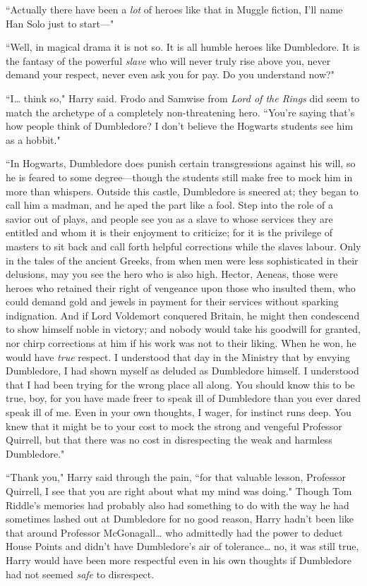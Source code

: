``Actually there have been a \emph{lot} of heroes like that in Muggle fiction, I'll name Han Solo just to start—"

``Well, in magical drama it is not so. It is all humble heroes like Dumbledore. It is the fantasy of the powerful \emph{slave} who will never truly rise above you, never demand your respect, never even ask you for pay. Do you understand now?"

``I{\ldots} think so," Harry said. Frodo and Samwise from \emph{Lord of the Rings} did seem to match the archetype of a completely non-threatening hero. ``You're saying that's how people think of Dumbledore? I don't believe the Hogwarts students see him as a hobbit."

``In Hogwarts, Dumbledore does punish certain transgressions against his will, so he is feared to some degree—though the students still make free to mock him in more than whispers. Outside this castle, Dumbledore is sneered at; they began to call him a madman, and he aped the part like a fool. Step into the role of a savior out of plays, and people see you as a slave to whose services they are entitled and whom it is their enjoyment to criticize; for it is the privilege of masters to sit back and call forth helpful corrections while the slaves labour. Only in the tales of the ancient Greeks, from when men were less sophisticated in their delusions, may you see the hero who is also high. Hector, Aeneas, those were heroes who retained their right of vengeance upon those who insulted them, who could demand gold and jewels in payment for their services without sparking indignation. And if Lord Voldemort conquered Britain, he might then condescend to show himself noble in victory; and nobody would take his goodwill for granted, nor chirp corrections at him if his work was not to their liking. When he won, he would have \emph{true} respect. I understood that day in the Ministry that by envying Dumbledore, I had shown myself as deluded as Dumbledore himself. I understood that I had been trying for the wrong place all along. You should know this to be true, boy, for you have made freer to speak ill of Dumbledore than you ever dared speak ill of me. Even in your own thoughts, I wager, for instinct runs deep. You knew that it might be to your cost to mock the strong and vengeful Professor Quirrell, but that there was no cost in disrespecting the weak and harmless Dumbledore."

``Thank you," Harry said through the pain, ``for that valuable lesson, Professor Quirrell, I see that you are right about what my mind was doing." Though Tom Riddle's memories had probably also had something to do with the way he had sometimes lashed out at Dumbledore for no good reason, Harry hadn't been like that around Professor McGonagall{\ldots} who admittedly had the power to deduct House Points and didn't have Dumbledore's air of tolerance{\ldots} no, it was still true, Harry would have been more respectful even in his own thoughts if Dumbledore had not seemed \emph{safe} to disrespect.

